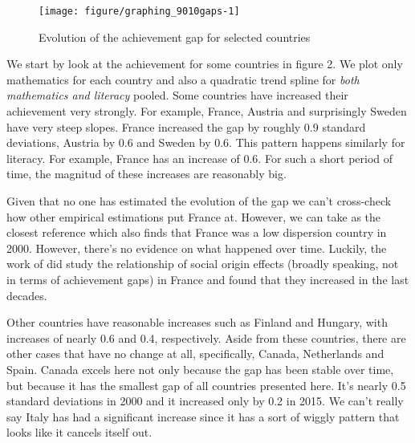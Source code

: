 \documentclass[11pt, a4paper]{article}\usepackage[]{graphicx}\usepackage[]{color}
\begin{document}
\begin{figure}

{\centering \texttt{[image: figure/graphing\_9010gaps-1]} 

}

\caption[Evolution of the achievement gap for selected countries]{Evolution of the achievement gap for selected countries}\label{fig:graphing_9010gaps}
\end{figure}



We start by look at the achievement for some countries in figure 2. We plot only mathematics for each country and also a quadratic trend spline for \emph{both mathematics and literacy} pooled. Some countries have increased their achievement very strongly. For example, France, Austria and surprisingly Sweden have very steep slopes. France increased the gap by roughly 0.9 standard deviations, Austria by 0.6 and Sweden by 0.6. This pattern happens similarly for literacy. For example, France has an increase of 0.6. For such a short period of time, the magnitud of these increases are reasonably big.

Given that no one has estimated the evolution of the gap we can't cross-check how other empirical estimations put France at. However, we can take \citet{micklewright} as the closest reference which also finds that France was a low dispersion country in 2000. However, there's no evidence on what happened over time. Luckily, the work of \citet{bernardi2016} did study the relationship of social origin effects (broadly speaking, not in terms of achievement gaps) in France and found that they increased in the last decades.

Other countries have reasonable increases such as Finland and Hungary, with increases of nearly 0.6 and 0.4, respectively. Aside from these countries, there are other cases that have no change at all, specifically, Canada, Netherlands and Spain. Canada excels here not only because the gap has been stable over time, but because it has the smallest gap of all countries presented here. It's nearly 0.5 standard deviations in 2000 and it increased only by 0.2 in 2015. We can't really say Italy has had a significant increase since it has a sort of wiggly pattern that looks like it cancels itself out.
\end{document}
